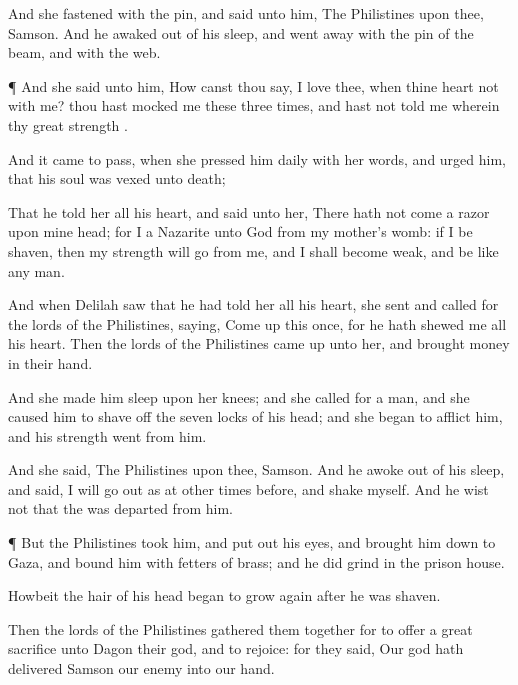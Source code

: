{And she
fastened
{} with the
pin, and
said unto him, The
Philistines
{} upon thee,
Samson. And he
awaked out of his
sleep, and went
away with the
pin of the
beam, and with the
web.


\par }{\PP {}¶ And she
said unto him,
How canst thou
say, I
love thee, when thine
heart
{} not with me? thou hast
mocked me these
three
times, and hast not
told me wherein thy
great
strength
{}.

And it came to pass, when she
pressed him
daily with her
words, and
urged him,
{} that his
soul was
vexed unto
death;

That he
told her all his
heart, and
said unto her, There hath not
come a
razor upon mine
head; for I
{} a
Nazarite unto
God from my
mother’s
womb: if I be
shaven, then my
strength will
go from me, and I shall become
weak, and be like any
{}
man.


\par }{\PP {}And when
Delilah
saw that he had
told her all his
heart, she
sent and
called for the
lords of the
Philistines,
saying, Come
up this
once, for he hath
shewed me all his
heart. Then the
lords of the
Philistines came
up unto her, and
brought
money in their
hand.

And she made him
sleep upon her
knees; and she
called for a
man, and she caused him to shave
off the
seven
locks of his
head; and she
began to
afflict him, and his
strength
went from him.

And she
said, The
Philistines
{} upon thee,
Samson. And he
awoke out of his
sleep, and
said, I will go
out as at other times
before, and
shake myself. And he
wist not that the
{} was
departed from him.


\par }{\PP {}¶ But the
Philistines
took him, and put
out his
eyes, and brought him
down to
Gaza, and
bound him with fetters of
brass; and he did
grind in the
prison
house.


\par }{\PP {}Howbeit the
hair of his
head
began to grow
again
after he was
shaven.

Then the
lords of the
Philistines gathered them
together for to
offer a
great
sacrifice unto
Dagon their
god, and to
rejoice: for they
said, Our
god hath
delivered
Samson our
enemy into our
hand.

}
